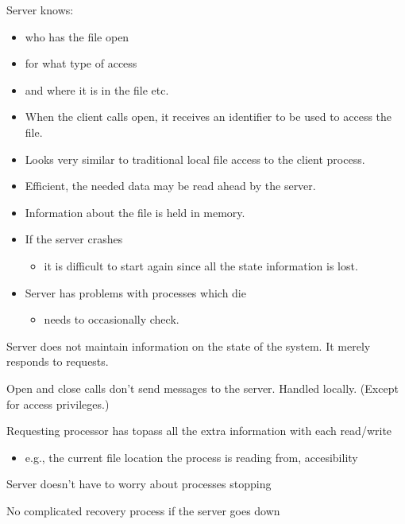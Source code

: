 \begin{slide}


    Server knows:
    \begin{itemize}
        \item who has the file open
        \item for what type of access
        \item and where it is in the file etc.
        \item When the client calls open, it receives an identifier to be used to access the file.
        \item Looks very similar to traditional local file access to the client process.
        \item Efficient, the needed data may be read ahead by the server.
        \item Information about the file is held in memory.
        \item If the server crashes
        \begin{itemize}
            \item it is difficult to start again since all the state information is lost.
        \end{itemize}
        \item Server has problems with processes which die
        \begin{itemize}
            \item needs to occasionally check.
        \end{itemize}
    \end{itemize}

\end{slide}

\begin{slide}


    Server does not maintain information on the state of the system. It merely responds to requests.
    \bigskip

    Open and close calls don’t send messages to the server. Handled locally. (Except for access privileges.)
    \bigskip

    Requesting processor has topass all the extra information with each read/write
    \begin{itemize}
        \item e.g., the current file location the process is reading from, accesibility
    \end{itemize}
    \bigskip

    Server doesn't have to worry about processes stopping
    \bigskip

    No complicated recovery process if the server goes down
    
\end{slide}

